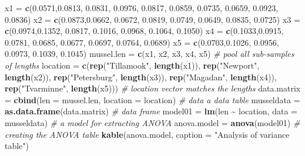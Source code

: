 \documentclass[
]{book}
\newenvironment{Shaded}{\begin{snugshade}}{\end{snugshade}}
\newcommand{\AttributeTok}[1]{\textcolor[rgb]{0.13,0.29,0.53}{#1}}
\newcommand{\CommentTok}[1]{\textcolor[rgb]{0.56,0.35,0.01}{\textit{#1}}}
\newcommand{\FloatTok}[1]{\textcolor[rgb]{0.00,0.00,0.81}{#1}}
\newcommand{\FunctionTok}[1]{\textcolor[rgb]{0.13,0.29,0.53}{\textbf{#1}}}
\newcommand{\NormalTok}[1]{#1}
\newcommand{\OtherTok}[1]{\textcolor[rgb]{0.56,0.35,0.01}{#1}}
\newcommand{\SpecialCharTok}[1]{\textcolor[rgb]{0.81,0.36,0.00}{\textbf{#1}}}
\newcommand{\StringTok}[1]{\textcolor[rgb]{0.31,0.60,0.02}{#1}}
\begin{document}
\begin{Shaded}
\begin{Highlighting}[]
\NormalTok{x1 }\OtherTok{=} \FunctionTok{c}\NormalTok{(}\FloatTok{0.0571}\NormalTok{,}\FloatTok{0.0813}\NormalTok{, }\FloatTok{0.0831}\NormalTok{, }\FloatTok{0.0976}\NormalTok{, }\FloatTok{0.0817}\NormalTok{, }\FloatTok{0.0859}\NormalTok{, }\FloatTok{0.0735}\NormalTok{, }\FloatTok{0.0659}\NormalTok{, }\FloatTok{0.0923}\NormalTok{, }\FloatTok{0.0836}\NormalTok{) }
\NormalTok{x2 }\OtherTok{=} \FunctionTok{c}\NormalTok{(}\FloatTok{0.0873}\NormalTok{,}\FloatTok{0.0662}\NormalTok{, }\FloatTok{0.0672}\NormalTok{, }\FloatTok{0.0819}\NormalTok{, }\FloatTok{0.0749}\NormalTok{, }\FloatTok{0.0649}\NormalTok{, }\FloatTok{0.0835}\NormalTok{, }\FloatTok{0.0725}\NormalTok{)}
\NormalTok{x3 }\OtherTok{=} \FunctionTok{c}\NormalTok{(}\FloatTok{0.0974}\NormalTok{,}\FloatTok{0.1352}\NormalTok{, }\FloatTok{0.0817}\NormalTok{, }\FloatTok{0.1016}\NormalTok{, }\FloatTok{0.0968}\NormalTok{, }\FloatTok{0.1064}\NormalTok{, }\FloatTok{0.1050}\NormalTok{)}
\NormalTok{x4 }\OtherTok{=} \FunctionTok{c}\NormalTok{(}\FloatTok{0.1033}\NormalTok{,}\FloatTok{0.0915}\NormalTok{, }\FloatTok{0.0781}\NormalTok{, }\FloatTok{0.0685}\NormalTok{, }\FloatTok{0.0677}\NormalTok{, }\FloatTok{0.0697}\NormalTok{, }\FloatTok{0.0764}\NormalTok{, }\FloatTok{0.0689}\NormalTok{)}
\NormalTok{x5 }\OtherTok{=} \FunctionTok{c}\NormalTok{(}\FloatTok{0.0703}\NormalTok{,}\FloatTok{0.1026}\NormalTok{, }\FloatTok{0.0956}\NormalTok{, }\FloatTok{0.0973}\NormalTok{, }\FloatTok{0.1039}\NormalTok{, }\FloatTok{0.1045}\NormalTok{)}
\NormalTok{mussel.len }\OtherTok{=} \FunctionTok{c}\NormalTok{(x1, x2, x3, x4, x5)      }\CommentTok{\# pool all sub{-}samples of lengths}
\NormalTok{location }\OtherTok{=} \FunctionTok{c}\NormalTok{(}\FunctionTok{rep}\NormalTok{(}\StringTok{"Tillamook"}\NormalTok{, }\FunctionTok{length}\NormalTok{(x1)), }
             \FunctionTok{rep}\NormalTok{(}\StringTok{"Newport"}\NormalTok{, }\FunctionTok{length}\NormalTok{(x2)),}
             \FunctionTok{rep}\NormalTok{(}\StringTok{"Petersburg"}\NormalTok{, }\FunctionTok{length}\NormalTok{(x3)),}
             \FunctionTok{rep}\NormalTok{(}\StringTok{"Magadan"}\NormalTok{, }\FunctionTok{length}\NormalTok{(x4)),}
             \FunctionTok{rep}\NormalTok{(}\StringTok{"Tvarminne"}\NormalTok{, }\FunctionTok{length}\NormalTok{(x5)))  }\CommentTok{\# location vector matches the lengths}
\NormalTok{data.matrix }\OtherTok{=} \FunctionTok{cbind}\NormalTok{(}\AttributeTok{len =}\NormalTok{ mussel.len, }\AttributeTok{location =}\NormalTok{ location)   }\CommentTok{\# data a data table}
\NormalTok{musseldata }\OtherTok{=} \FunctionTok{as.data.frame}\NormalTok{(data.matrix)        }\CommentTok{\# data frame}
\NormalTok{model01 }\OtherTok{=} \FunctionTok{lm}\NormalTok{(len }\SpecialCharTok{\textasciitilde{}}\NormalTok{ location, }\AttributeTok{data =}\NormalTok{ musseldata)  }\CommentTok{\# a model for extracting ANOVA}
\NormalTok{anova.model }\OtherTok{=} \FunctionTok{anova}\NormalTok{(model01)   }\CommentTok{\# creating the ANOVA table}
\FunctionTok{kable}\NormalTok{(anova.model, }\AttributeTok{caption =} \StringTok{"Analysis of variance table"}\NormalTok{)}
\end{Highlighting}
\end{Shaded}
\end{document}
